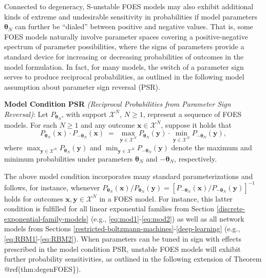 \documentclass[]{article}
\theoremstyle{definition}
\begin{document}
Connected to degeneracy, S-unstable FOES models may also exhibit
additional kinds of extreme and undesirable sensitivity in probabilities
if model parameters \(\boldsymbol \theta_N\) can further be ``dialed''
between positive and negative values. That is, some FOES models
naturally involve parameter spaces covering a positive-negative spectrum
of parameter possibilities, where the signs of parameters provide a
standard device for increasing or decreasing probabilities of outcomes
in the model formulation. In fact, for many models, the switch of a
parameter sign serves to produce reciprocal probabilities, as outlined
in the following model assumption about parameter sign reversal (PSR).

\textbf{Model Condition PSR} \emph{(Reciprocal Probabilities from
Parameter Sign Reversal)}: Let \(P_{\boldsymbol \theta_N}\), with
support \(\mathcal{X}^N\), \(N\geq 1\), represent a sequence of FOES
models. For each \(N \geq 1\) and any outcome
\(\boldsymbol x \in \mathcal{X}^N\), suppose it holds that \[
P_{\boldsymbol \theta_N}(\boldsymbol x)  \cdot P_{-\boldsymbol \theta_N}(\boldsymbol x) \;=\;   \max\limits_{\boldsymbol y \in \mathcal{X}^N}P_{ \boldsymbol \theta_N}(\boldsymbol y)\cdot \min\limits_{\boldsymbol y \in \mathcal{X}^N}P_{-\boldsymbol \theta_N}(\boldsymbol y),
\] where
\(\max_{\boldsymbol y \in \mathcal{X}^N}P_{ \boldsymbol \theta_N}(\boldsymbol y)\)
and
\(\min_{\boldsymbol y \in \mathcal{X}^N}P_{-\boldsymbol \theta_N}(\boldsymbol y)\)
denote the maximum and minimum probabilities under parameters
\(\boldsymbol \theta_N\) and \(-\boldsymbol \theta_N\), respectively.

The above model condition incorporates many standard parameterizations
and follows, for instance, whenever
\(P_{\boldsymbol \theta_N}(\boldsymbol x)/P_{\boldsymbol \theta_N}(\boldsymbol y) = [P_{-\boldsymbol \theta_N}(\boldsymbol x)/P_{-\boldsymbol \theta_N}(\boldsymbol y)]^{-1}\)
holds for outcomes \(\boldsymbol x, \boldsymbol y \in\mathcal{X}^N\) in
a FOES model. For instance, this latter condition is fulfilled for all
linear exponential families from Section
\ref{discrete-exponential-family-models} (e.g.,
\eqref{eq:mod1}-\eqref{eq:mod2}) as well as all network models from Sections
\ref{restricted-boltzmann-machines}-\ref{deep-learning} (e.g.,
\eqref{eq:RBM1}-\eqref{eq:RBM2}). When parameters can be tuned in sign with
effects prescribed in the model condition PSR, unstable FOES models will
exhibit further probability sensitivities, as outlined in the following
extension of Theorem @ref(thm:degenFOES\}).
\end{document}
